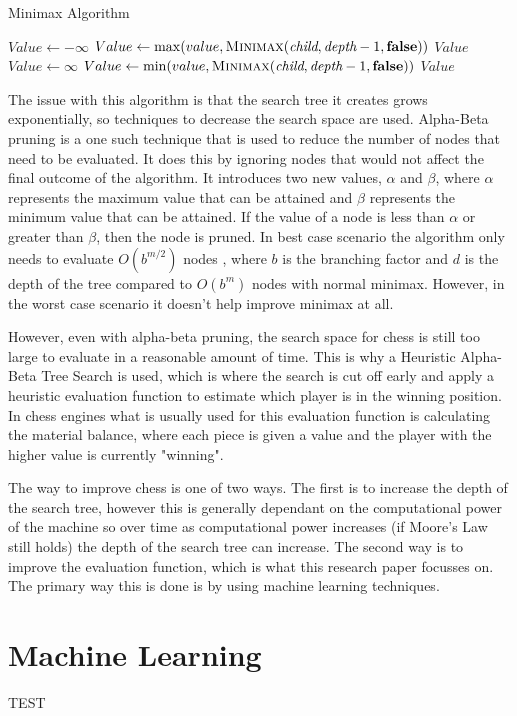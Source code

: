 \begin{algorithm}[h]
    \caption{Minimax Algorithm}
    \begin{algorithmic}
        \State \Return {}
        \EndIf
        \State $Value \gets -\infty$
        \State $Value \gets \max(value, \textsc{Minimax}(\textit{child}, \textit{depth} - 1, \textbf{false}))$
        \EndFor
        \State \Return $Value$
        \Else
        \State $Value \gets \infty$
        \State $Value \gets \min(value, \textsc{Minimax}(\textit{child}, \textit{depth} - 1, \textbf{false}))$
        \EndFor
        \State \Return $Value$
        \EndIf
        \EndFunction
    \end{algorithmic}
\end{algorithm}
The issue with this algorithm is that the search tree it creates grows exponentially, so techniques to decrease the search space are used. Alpha-Beta pruning is a one such technique that is used to reduce the number of nodes that need to be evaluated. It does this by ignoring nodes that would not affect the final outcome of the algorithm. It introduces two new values, ${\alpha}$ and ${\beta}$, where ${\alpha}$ represents the maximum value that can be attained and ${\beta}$ represents the minimum value that can be attained. If the value of a node is less than ${\alpha}$ or greater than ${\beta}$, then the node is pruned. In best case scenario the algorithm only needs to evaluate ${O(b^{m/2})}$ nodes \cite{russellArtificialIntelligenceModern2022}, where ${b}$ is the branching factor and ${d}$ is the depth of the tree compared to ${O(b^m)}$ nodes with normal minimax. However, in the worst case scenario it doesn't help improve minimax at all.

However, even with alpha-beta pruning, the search space for chess is still too large to evaluate in a reasonable amount of time.  This is why a Heuristic Alpha-Beta Tree Search is used, which is where the search is cut off early and apply a heuristic evaluation function to estimate which player is in the winning position. In chess engines what is usually used for this evaluation function is calculating the material balance, where each piece is given a value and the player with the higher value is currently "winning".

The way to improve chess is one of two ways. The first is to increase the depth of the search tree, however this is generally dependant on the computational power of the machine so over time as computational power increases (if Moore's Law still holds) the depth of the search tree can increase. The second way is to improve the evaluation function, which is what this research paper focusses on. The primary way this is done is by using machine learning techniques. 

\section{Machine Learning}
TEST